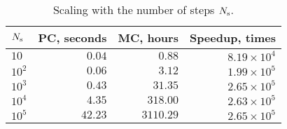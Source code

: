 \begin{table}[h]
  \vspace{-5pt}
  \centering
  \caption{Scaling with the number of steps $N_\text{s}$.}
  \begin{tabular}{lrrr}
    \toprule
    $N_\text{s}$ & PC, seconds & MC, hours & Speedup, times \\
    \midrule
    $   10$ & $ 0.04$ & $   0.88$ & $8.19 \times 10^4$ \\
    $ 10^2$ & $ 0.06$ & $   3.12$ & $1.99 \times 10^5$ \\
    $ 10^3$ & $ 0.43$ & $  31.35$ & $2.65 \times 10^5$ \\
    $ 10^4$ & $ 4.35$ & $ 318.00$ & $2.63 \times 10^5$ \\
    $ 10^5$ & $42.23$ & $3110.29$ & $2.65 \times 10^5$ \\
    \bottomrule
  \end{tabular}
  \vspace{-5pt}
\end{table}
